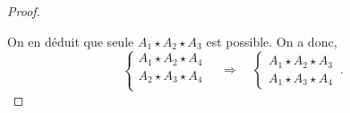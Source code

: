 \begin{cor}
\begin{proof}
\begin{itemize}[$\bullet$]
        \end{itemize}
        On en déduit que seule $A_1 \star A_2 \star A_3$ est possible. On a donc,
        \begin{equation*}
        \left\{
            \begin{array}{c}
                 A_{1} \star A_{2} \star A_{4} \\
                 A_{2} \star A_{3} \star A_{4}\\
            \end{array}
            \right. \quad \Longrightarrow \quad \left\{
            \begin{array}{c}
                A_1 \star A_2 \star A_3\\
                A_1 \star A_3 \star A_4
            \end{array}
            \right.\,.
    \end{equation*}
    \end{proof}
\end{cor}
